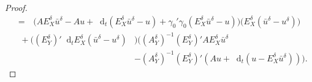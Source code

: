 \documentclass{amsart}
\numberwithin{equation}{section}
\newcommand{\1}{\mathbb 1}
\newcommand*\diff{\mathop{}\!\mathrm{d}}
\newcommand{\be}{\begin{equation}}
\newcommand{\ee}{\end{equation}}
\begin{document}
\begin{proof}
\begin{align}
=&\,\big(A E_X^\delta \bar{u}^\delta-Au+\diff_t(E_X^\delta \bar{u}^\delta-u)+\gamma_0' \gamma_0 (E_X^\delta \bar{u}^\delta-u)\big)\big(E_X^\delta(\bar{u}^\delta-u^\delta)\big)\label{eq:18}
\end{align}
\vspace*{-4ex}
\be \label{eq:19}
\begin{split}
\hspace{1em}+\big((E_Y^\delta)' \diff_t E_X^\delta(\bar{u}^\delta-u^\delta)&\big)\Big((A_Y^\delta)^{-1} (E_Y^\delta)' A E_X^\delta \bar{u}^\delta\\
&-(A_Y^\delta)^{-1}(E_Y^\delta)'(Au+\diff_t(u-E_X^\delta \bar{u}^\delta))\Big).
\end{split}
\ee


\end{proof}
\end{document}

